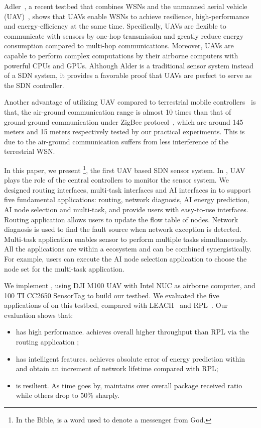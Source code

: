 Adler~\cite{Alder}, a recent testbed that combines WSNs
and the unmanned aerial vehicle (UAV)~\cite{Cambone2005Unmanned, Perry2000Unmanned, Cathcart2014Method},
shows that UAVs enable WSNs to achieve resilience, 
high-performance and energy-efficiency at the same time.
Specifically, UAVs are flexible to 
communicate with sensors by one-hop transmission
and greatly reduce energy consumption compared to multi-hop communications.
Moreover, UAVs are capable to perform complex computations 
by their airborne computers with powerful CPUs and GPUs.
Although Alder is a traditional sensor system instead of a SDN system, 
it provides a favorable proof
that UAVs are perfect to serve as the SDN controller.

Another advantage of utilizing UAV compared to
terrestrial mobile controllers~\cite{Somasundara2007Mobile} is that, the air-ground communication range
is almost 10 times than that of ground-ground communication under ZigBee protocol~\cite{Farahani2008ZigBee}, which are
around 145 meters and 15 meters respectively tested by our practical experiments.
This is due to the air-ground communication suffers from less interference of the terrestrial WSN.

In this paper, we present {\sdn}\footnote{In the Bible, {\sdn} is a word used to denote a messenger from God. }, 
the first UAV based SDN sensor system.
In {\sdn}, UAV plays the role of the central controllers to monitor the sensor system.
We designed routing interfaces, multi-task interfaces and AI interfaces in {\sdn} to support
five fundamental applications: routing, network diagnosis, 
AI energy prediction, AI node selection and multi-task,
and provide users with easy-to-use interfaces.
Routing application allows users to update the flow table of nodes.
Network diagnosis is used to find the fault source when network exception is detected.
Multi-task application enables sensor to perform multiple 
tasks simultaneously. All the applications are within a ecosystem
and can be combined synergistically. For example,
users can execute the AI node selection application to choose
the node set for the multi-task application. 


We implement {\sdn}, using DJI M100 UAV with Intel NUC as airborne computer, 
and 100 TI CC2650 SensorTag to build our testbed.
We evaluated the five applications of  {\sdn} on this testbed, 
compared with LEACH~\cite{kaur2016wsn} and RPL~\cite{winter2012rpl}.
Our evaluation shows that:
\begin{itemize}
	\item[1)] {\sdn} has high performance. {\sdn} achieves overall {\simpleTput} higher
		throughput than RPL via the routing application ;
	\item[2)] {\sdn} has intelligent features. {\sdn} achieves  absolute error of energy prediction within {\Error} 
		and obtain an {\totalLife} increment of network lifetime compared with RPL;
	\item[3)] {\sdn} is resilient. As time goes by, {\sdn} maintains over
		{\pktRecvRatio} overall package received ratio while others drop to 50\%
		sharply.
\end{itemize}

